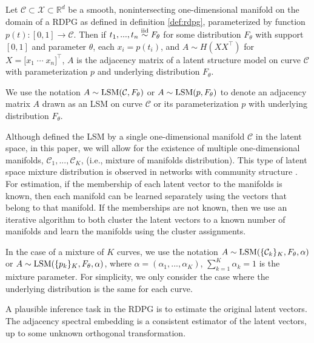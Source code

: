\documentclass[12pt]{article}
\begin{document}
\begin{definition}
\label{def:lsm}
Let $\mathcal{C} \subset \mathcal{X} \subset \mathbb{R}^d$ be a smooth, nonintersecting one-dimensional manifold on the domain of a RDPG as defined in definition \ref{def:rdpg}, parameterized by function $p(t) : [0, 1] \to \mathcal{C}$. 
Then if $t_1, ..., t_n \stackrel{\mathrm{iid}}{\sim} F_\theta$ for some distribution $F_\theta$ with support $[0, 1]$ and parameter $\theta$, each $x_i = p(t_i)$, and $ A \sim H(X X^\top)$ for $X = \bigl[x_1 \; \cdots \; x_n\bigr]^\top$, $A$ is the adjacency matrix of a latent structure model on curve $\mathcal{C}$ with parameterization $p$ and underlying distribution $F_\theta$. 

We use the notation $A \sim \mathrm{LSM}(\mathcal{C}, F_\theta)$ or $A \sim \mathrm{LSM}(p, F_\theta)$ to denote an adjacency matrix $A$ drawn as an LSM on curve $\mathcal{C}$ or its parameterization $p$ with underlying distribution $F_\theta$. 
\end{definition}

\begin{remark}
\label{rem:lsm-mixture}
Although \citet{athreya2020estimation} defined the LSM by a single one-dimensional manifold $\mathcal{C}$ in the latent space, in this paper, we will allow for the existence of multiple one-dimensional manifolds, $\mathcal{C}_1, ..., \mathcal{C}_K$, (i.e., mixture of manifolds distribution). 
This type of latent space mixture distribution is observed in networks with community structure \citep{10.5555/3122009.3242083}. 
For estimation, if the membership of each latent vector to the manifolds is known, then each manifold can be learned separately using the vectors that belong to that manifold. 
If the memberships are not known, then we use an iterative algorithm to both cluster the latent vectors to a known number of manifolds and learn the manifolds using the cluster assignments. 

In the case of a mixture of $K$ curves, we use the notation $A \sim \mathrm{LSM}(\{\mathcal{C}_k\}_K, F_\theta, \alpha)$ or $A \sim \mathrm{LSM}(\{p_k\}_K, F_\theta, \alpha)$, where $\alpha = (\alpha_1, ..., \alpha_K)$, $\sum_{k=1}^K \alpha_k = 1$ is the mixture parameter. 
For simplicity, we only consider the case where the underlying distribution is the same for each curve. 
\end{remark}

A plausible inference task in the RDPG is to estimate the original
latent vectors. The adjacency spectral embedding
\citep{doi:10.1080/01621459.2012.699795} is a consistent estimator of
the latent vectors, up to some unknown orthogonal transformation.
\end{document}
